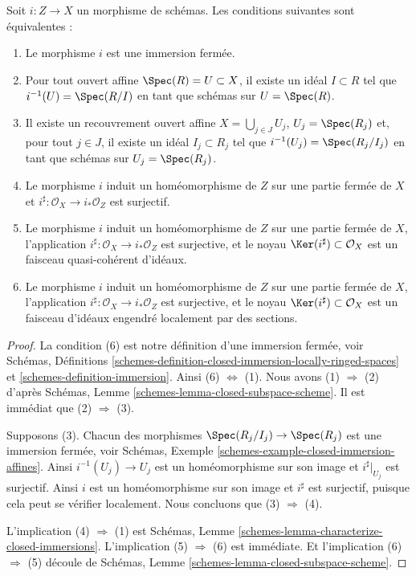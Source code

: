 \begin{lemma}
\label{lemma-closed-immersion}
Soit $i : Z \to X$ un morphisme de schémas.
Les conditions suivantes sont équivalentes :
\begin{enumerate}
\item Le morphisme $i$ est une immersion fermée.
\item Pour tout ouvert affine $\Spec(R) = U \subset X$,
il existe un idéal $I \subset R$ tel que
$i^{-1}(U) = \Spec(R/I)$ en tant que schémas sur $U = \Spec(R)$.
\item Il existe un recouvrement ouvert affine $X = \bigcup_{j \in J} U_j$,
$U_j = \Spec(R_j)$ et, pour tout $j \in J$, il existe
un idéal $I_j \subset R_j$ tel que
$i^{-1}(U_j) = \Spec(R_j/I_j)$ en tant que schémas sur $U_j = \Spec(R_j)$.
\item Le morphisme $i$ induit un homéomorphisme de $Z$ sur une partie fermée
de $X$ et $i^\sharp : \mathcal{O}_X \to i_*\mathcal{O}_Z$ est surjectif.
\item Le morphisme $i$ induit un homéomorphisme de $Z$ sur une partie fermée
de $X$, l'application $i^\sharp : \mathcal{O}_X \to i_*\mathcal{O}_Z$ est surjective,
et le noyau $\Ker(i^\sharp)\subset \mathcal{O}_X$ est un faisceau quasi-cohérent
d'idéaux.
\item Le morphisme $i$ induit un homéomorphisme de $Z$ sur une partie fermée
de $X$, l'application $i^\sharp : \mathcal{O}_X \to i_*\mathcal{O}_Z$ est surjective,
et le noyau $\Ker(i^\sharp)\subset \mathcal{O}_X$ est un
faisceau d'idéaux engendré localement par des sections.
\end{enumerate}
\end{lemma}

\begin{proof}
La condition (6) est notre définition d'une immersion fermée, voir Schémas,
Définitions \ref{schemes-definition-closed-immersion-locally-ringed-spaces}
et \ref{schemes-definition-immersion}.
Ainsi (6) $\Leftrightarrow$ (1). Nous avons (1) $\Rightarrow$ (2) d'après
Schémas, Lemme \ref{schemes-lemma-closed-subspace-scheme}.
Il est immédiat que (2) $\Rightarrow$ (3).

\medskip\noindent
Supposons (3). Chacun des morphismes
$\Spec(R_j/I_j) \to \Spec(R_j)$ est
une immersion fermée, voir
Schémas, Exemple \ref{schemes-example-closed-immersion-affines}.
Ainsi $i^{-1}(U_j) \to U_j$ est un homéomorphisme sur son image
et $i^\sharp|_{U_j}$ est surjectif. Ainsi $i$ est un homéomorphisme
sur son image et $i^\sharp$ est surjectif, puisque cela peut se
vérifier localement. Nous concluons que (3) $\Rightarrow$ (4).

\medskip\noindent
L'implication (4) $\Rightarrow$ (1) est
Schémas, Lemme \ref{schemes-lemma-characterize-closed-immersions}.
L'implication (5) $\Rightarrow$ (6) est immédiate.
Et l'implication (6) $\Rightarrow$ (5) découle
de Schémas, Lemme \ref{schemes-lemma-closed-subspace-scheme}.
\end{proof}

